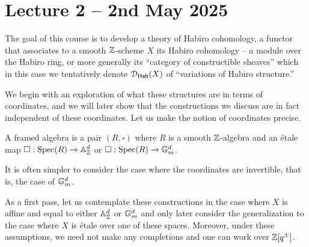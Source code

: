 \section{Lecture 2 -- 2nd May 2025}\label{sec: lecture 2}
The goal of this course is to develop a theory of Habiro cohomology, a functor that associates to a smooth $\mathbb{Z}$-scheme $X$ its Habiro cohomology -- a module over the Habiro ring, or more generally its ``category of constructible sheaves'' which in this case we tentatively denote $\EuScript{D}_{\mathsf{Hab}}(X)$ of ``variations of Habiro structure.''

We begin with an exploration of what these structures are in terms of coordinates, and we will later show that the constructions we discuss are in fact independent of these coordinates. Let us make the notion of coordinates precise. 
\begin{definition}\label{def: framed algebra}
    A framed algebra is a pair $(R,\square)$ where $R$ is a smooth $\mathbb{Z}$-algebra and an \'{e}tale map $\square:\operatorname{Spec}(R)\to\mathbb{A}^{d}_{\mathbb{Z}}$ or $\square:\operatorname{Spec}(R)\to\mathbb{G}_{m}^{d}$. 
\end{definition}
\begin{remark}
    It is often simpler to consider the case where the coordinates are invertible, that is, the case of $\mathbb{G}_{m}^{d}$. 
\end{remark}
As a first pass, let us contemplate these constructions in the case where $X$ is affine and equal to either $\mathbb{A}^{d}_{\mathbb{Z}}$ or $\mathbb{G}_{m}^{d}$ and only later consider the generalization to the case where $X$ is \'{e}tale over one of these spaces. Moreover, under these assumptions, we need not make any completions and one can work over $\mathbb{Z}[q^{\pm}]$.

